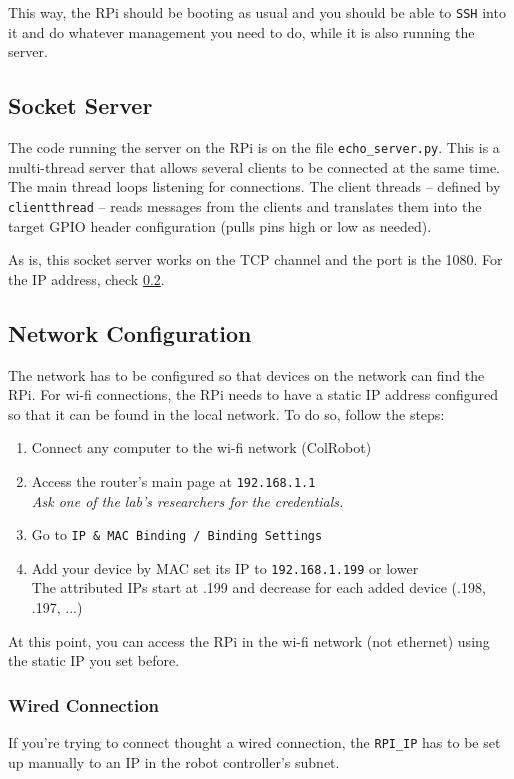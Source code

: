 \documentclass[twoside,a4paper]{refart}
\begin{document}
This way, the RPi should be booting as usual and you should be able to {\tt SSH} into it and do whatever management you need to do, while it is also running the server.


\subsection{Socket Server}\label{sub:socket_server}
The code running the server on the RPi is on the file {\tt echo\_server.py}. This is a multi-thread server that allows several clients to be connected at the same time. The main thread loops listening for connections. The client threads -- defined by {\tt clientthread} -- reads messages from the clients and translates them into the target GPIO header configuration (pulls pins high or low as needed).

As is, this socket server works on the TCP channel and the port is the 1080. For the IP address, check \cref{sub:network_conf}.


\subsection{Network Configuration}\label{sub:network_conf}
The network has to be configured so that devices on the network can find the RPi. For wi-fi connections, the RPi needs to have a static IP address configured so that it can be found in the local network. To do so, follow the steps:
\begin{enumerate}
	\item
	Connect any computer to the wi-fi network (ColRobot)
	\item
	Access the router's main page at {\tt 192.168.1.1} \\
	\emph{Ask one of the lab's researchers for the credentials.}
	\item
	Go to {\tt IP \& MAC Binding / Binding Settings}
	\item
	Add your device by MAC set its IP to {\tt 192.168.1.199} or lower \\
	The attributed IPs start at .199 and decrease for each added device (.198, .197, ...)
\end{enumerate}
At this point, you can access the RPi in the wi-fi network (not ethernet) using the static IP you set before.

\subsubsection{Wired Connection}
If you're trying to connect thought a wired connection, the {\tt RPI\_IP} has to be set up manually to an IP in the robot controller's subnet.
\end{document}

